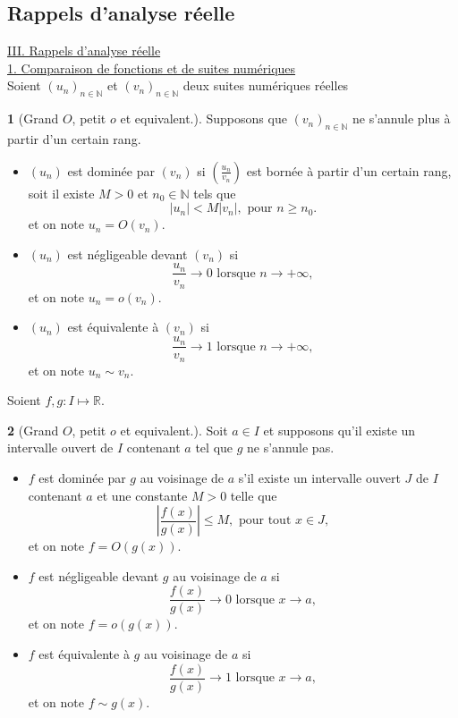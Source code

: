 \documentclass[8pt,notheorems]{beamer}
\def \N{\mathbb N}
\theoremstyle{definition}
\newtheorem{definition}{\translate{Definition}}
\theoremstyle{example}
\theoremstyle{mystyle}
\theoremstyle{plain}
\begin{document}
\begin{frame}[allowframebreaks]
\section{Rappels d'analyse réelle}
\underline{III. Rappels d'analyse réelle}\\

\underline{1. Comparaison de fonctions et de suites numériques}\\
Soient $(u_n)_{n\in\N}$ et $(v_n)_{n\in\N}$ deux suites numériques réelles
\begin{definition}[Grand $O$, petit $o$ et equivalent.]
Supposons que $(v_n)_{n\in\N}$ ne s'annule plus à partir d'un certain rang.
\begin{itemize}
    \item $(u_n)$ est dominée par $(v_n)$ si $\left(\frac{u_n}{v_n}\right)$ est bornée à partir d'un certain rang, soit il existe $M>0$ et $n_0\in\N$ tels que
    $$
    |u_n|<M|v_n|,\text{ pour }n\geq n_0.
    $$
    et on note $u_n = O(v_n).$
    \item $(u_n)$ est négligeable devant $(v_n)$ si
    $$
    \frac{u_n}{v_n}\rightarrow0\text{ lorsque }n\rightarrow +\infty,
    $$
    et on note $u_n = o(v_n)$.
    \item $(u_n)$ est équivalente à $(v_n)$ si
    $$
    \frac{u_n}{v_n}\rightarrow1\text{ lorsque }n\rightarrow +\infty,
    $$
    et on note $u_n \sim v_n$.
\end{itemize}
\end{definition}
Soient $f,g:I\mapsto \mathbb{R}$.
\begin{definition}[Grand $O$, petit $o$ et equivalent.]
Soit $a\in I$ et supposons qu'il existe un intervalle ouvert de $I$ contenant $a$ tel que $g$ ne s'annule pas.
\begin{itemize}
    \item $f$ est dominée par $g$ au voisinage de $a$ s'il existe un intervalle ouvert $J$ de $I$ contenant $a$ et une constante $M>0$ telle que
    $$
    \left|\frac{f(x)}{g(x)}\right|\leq M,\text{ pour tout }x\in J,
    $$
    et on note $f = O(g(x)).$
    \item $f$ est négligeable devant $g$ au voisinage de $a$ si
    $$
    \frac{f(x)}{g(x)}\rightarrow0\text{ lorsque }x\rightarrow a,
    $$
    et on note $f = o(g(x))$.
    \item $f$ est équivalente à $g$ au voisinage de $a$ si
    $$
    \frac{f(x)}{g(x)}\rightarrow1\text{ lorsque }x\rightarrow a,
    $$
    et on note $f \sim g(x)$.
\end{itemize}
\end{definition}
\end{frame}
\end{document}
